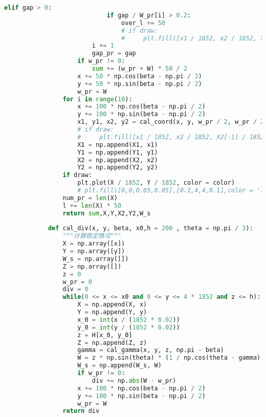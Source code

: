 \documentclass[withoutpreface,bwprint]{cumcmthesis} %
\begin{document}
\begin{appendices}
\begin{lstlisting}[language=python]
                        elif gap > 0:
                            if gap / W_pr[i] > 0.2:
                                over_l += 50
                                # if draw:
                                #     plt.fill([x1 / 1852, x2 / 1852, X2[-1] / 1852, X1[-1] / 1852], [y1 / 1852, y2 / 1852, Y2[-1] / 1852, Y1[-1] / 1852], color = 'red')
                        i += 1
                        gap_pr = gap
                    if w_pr != 0:
                        sum += (w_pr + W) * 50 / 2
                    x += 50 * np.cos(beta - np.pi / 2)
                    y += 50 * np.sin(beta - np.pi / 2)
                    w_pr = W
                for i in range(10):
                    x += 100 * np.cos(beta - np.pi / 2)
                    y += 100 * np.sin(beta - np.pi / 2)
                    x1, y1, x2, y2 = cal_coord(x, y, w_pr / 2, w_pr / 2 , beta)
                    # if draw:
                    #     plt.fill([x1 / 1852, x2 / 1852, X2[-1] / 1852, X1[-1] / 1852], [y1 / 1852, y2 / 1852, Y2[-1] / 1852, Y1[-1] / 1852], color = 'lightblue')
                    X1 = np.append(X1, x1)
                    Y1 = np.append(Y1, y1)
                    X2 = np.append(X2, x2)
                    Y2 = np.append(Y2, y2)
                if draw:
                    plt.plot(X / 1852, Y / 1852, color = color)
                    # plt.fill([0,0,0.05,0.05],[0.1,4,4,0.1],color = 'lightblue')
                num_pr = len(X)
                l += len(X) * 50
                return sum,X,Y,X2,Y2,W_s
            
            def cal_div(x, y, beta, x0,h = 200 , theta = np.pi / 3):
                """计算稳定情况"""
                X = np.array([x])
                Y = np.array([y])
                W_s = np.array([])
                Z = np.array([])
                z = 0
                w_pr = 0
                div = 0
                while(0 <= x <= x0 and 0 <= y <= 4 * 1852 and z <= h):
                    X = np.append(X, x)
                    Y = np.append(Y, y)
                    x_0 = int(x / (1852 * 0.02))
                    y_0 = int(y / (1852 * 0.02))
                    z = H[x_0, y_0]
                    Z = np.append(Z, z)
                    gamma = cal_gamma(x, y, z, np.pi - beta)
                    W = z * np.sin(theta) * (1 / np.cos(theta - gamma) + 1 / np.cos(theta + gamma)) * np.cos(gamma)
                    W_s = np.append(W_s, W)
                    if w_pr != 0:
                        div += np.abs(W - w_pr)
                    x += 100 * np.cos(beta - np.pi / 2)
                    y += 100 * np.sin(beta - np.pi / 2)
                    w_pr = W
                return div
            

\end{lstlisting}
\end{appendices}
\end{document}
